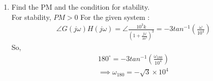 \begin{enumerate}[label=\arabic*.,ref=\theenumi]
\begin{table}[!ht]
\centering

\caption{}
\label{table:ee18btech11006_Factors}
\end{table}
\item Find the PM and the condition for stability.
\\
\solution 
For stability, $PM > 0$
For the given system :
\begin{align}
   \angle G(j\omega)H(j\omega) =  \angle\frac{10^3k}{\left(1+\frac{j\omega}{10^4}\right)^3} 
   = -3tan^{-1}\left({\frac{\omega}{10^4}}\right)
\end{align}
So,
\begin{align}
   180^{\circ}=  -3tan^{-1}\left({\frac{\omega_{180}}{10^4}}\right)\\
   \implies \omega_{180} = -\sqrt{3}\times 10^4
\end{align}

\end{enumerate}
